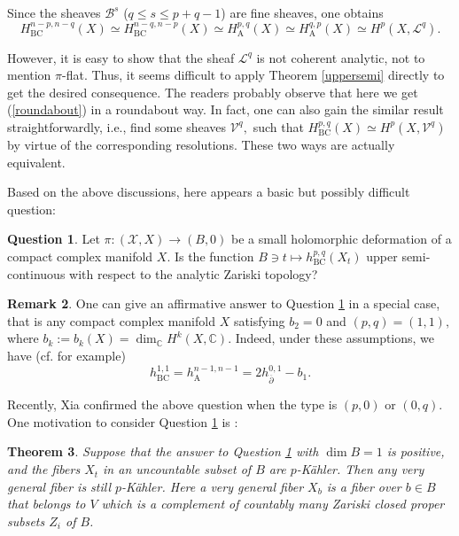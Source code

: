 \documentclass[12pt]{amsart}
\numberwithin{equation}{section}
\newtheorem{theorem} {Theorem} [section]
\theoremstyle{definition}
\newtheorem{question}  [theorem]     {Question}
\theoremstyle{definition}
\theoremstyle{definition}
\newtheorem{remark}  [theorem]     {Remark}
\renewcommand{\1}{\mathsf{1}}
\renewcommand{\>}{\rightarrow}
\newcommand{\bp}{\overline\partial}
\def\mb{\mathbb}
\theoremstyle{plain} %
\theoremstyle{plain} %
\theoremstyle{plain} %
\begin{document}
	Since the sheaves $\mathscr{B}^s$ ($q\leq s\leq p+q-1 $) are fine  sheaves, one obtains
	\begin{equation}\label{roundabout}
		H^{n-p,n-q}_{\mathrm {BC}}(X)\simeq H^{n-q,n-p}_{\mathrm {BC}}(X)\simeq H^{p,q}_\mathrm{A}(X)\simeq H^{q,p}_\mathrm{A}(X)\simeq H^p(X,\mathscr{L}^q).
	\end{equation}
	
	However, it is easy to show that the sheaf  $\mathscr{L}^q$ is not coherent analytic, not to mention $\pi$-flat. Thus, it seems difficult to  apply Theorem \ref{uppersemi} directly to get the desired consequence. The readers probably observe that here we get (\ref{roundabout}) in a roundabout way.  In fact, one can also gain the similar result straightforwardly, i.e., find some sheaves $\mathscr{V}^q,$ such that $H^{p,q}_{\mathrm {BC}}(X)\simeq H^p (X,\mathscr{V}^q)$ by virtue of the corresponding resolutions. These two ways are actually equivalent.
	
	Based on the above discussions, here appears a basic but possibly difficult question:
	
	\begin{question}\label{question}
		Let $\pi:(\mathcal{X}, X) \rightarrow(B, 0)$ be a small holomorphic deformation  of a compact complex manifold $X$. %
		Is the function  $B\ni t\mapsto h^{p,q}_{\mathrm {BC}}(X_t)$  upper semi-continuous with respect to the analytic Zariski topology?
	\end{question}
	
	
	\begin{remark}\label{key}
		One can give an affirmative answer to Question \ref{question}
		in a special case, that is any compact complex manifold $X$ satisfying $b_2=0$ and  $(p,q)=(1,1),$ where $b_k:=b_k(X)=\dim_{\mathbb{C}}H^{k}(X,\mb C)$. Indeed, under these assumptions, we have (cf. \cite[Theorem 6.2]{Mc19} for example)
		$$h^{1,1}_{\mathrm {BC}}=h^{n-1,n-1}_\mathrm A=2h^{0,1}_{\bp}-b_1.$$
		
		Recently,  Xia   \cite[Theorem 1.1, Remark 3.6]{Xi21a} confirmed the above question when the type is $(p,0)$ or $(0,q)$. One motivation to consider  Question \ref{question} is :
		
	\end{remark}
	
	
	\begin{theorem}\label{uncontable}
		Suppose that the answer to Question \ref{question}  with $\dim B=1$ is positive, and the fibers $X_t$ in an uncountable subset of $B$ are $p$-K\"{a}hler. Then any very general fiber is still $p$-K\"{a}hler. Here a very general fiber $X_b$ is a fiber over $b\in B$ that belongs to  $V$ which is a complement of countably many Zariski closed proper subsets $Z_i$ of $B$.
	\end{theorem}
	
\end{document}
